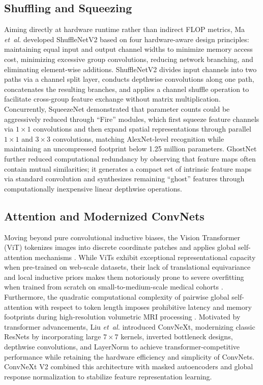 \subsection{Shuffling and Squeezing}
Aiming directly at hardware runtime rather than indirect FLOP metrics, Ma \emph{et~al.} \cite{32} developed ShuffleNetV2 based on four hardware-aware design principles: maintaining equal input and output channel widths to minimize memory access cost, minimizing excessive group convolutions, reducing network branching, and eliminating element-wise additions. ShuffleNetV2 divides input channels into two paths via a channel split layer, conducts depthwise convolutions along one path, concatenates the resulting branches, and applies a channel shuffle operation to facilitate cross-group feature exchange without matrix multiplication. Concurrently, SqueezeNet \cite{17} demonstrated that parameter counts could be aggressively reduced through ``Fire'' modules, which first squeeze feature channels via $1\times1$ convolutions and then expand spatial representations through parallel $1\times1$ and $3\times3$ convolutions, matching AlexNet-level recognition while maintaining an uncompressed footprint below 1.25 million parameters. GhostNet \cite{13} further reduced computational redundancy by observing that feature maps often contain mutual similarities; it generates a compact set of intrinsic feature maps via standard convolution and synthesizes remaining ``ghost'' features through computationally inexpensive linear depthwise operations.

\subsection{Attention and Modernized ConvNets}
Moving beyond pure convolutional inductive biases, the Vision Transformer (ViT) \cite{8} tokenizes images into discrete coordinate patches and applies global self-attention mechanisms \cite{43}. While ViTs exhibit exceptional representational capacity when pre-trained on web-scale datasets, their lack of translational equivariance and local inductive priors makes them notoriously prone to severe overfitting when trained from scratch on small-to-medium-scale medical cohorts \cite{24}. Furthermore, the quadratic computational complexity of pairwise global self-attention with respect to token length imposes prohibitive latency and memory footprints during high-resolution volumetric MRI processing \cite{26}. Motivated by transformer advancements, Liu \emph{et~al.} \cite{30} introduced ConvNeXt, modernizing classic ResNets by incorporating large $7\times7$ kernels, inverted bottleneck designs, depthwise convolutions, and LayerNorm to achieve transformer-competitive performance while retaining the hardware efficiency and simplicity of ConvNets. ConvNeXt V2 \cite{46} combined this architecture with masked autoencoders and global response normalization to stabilize feature representation learning.


